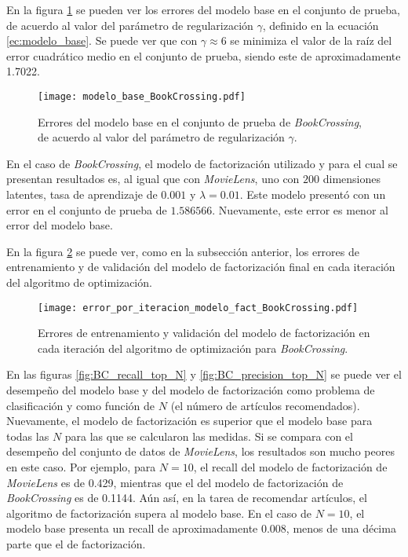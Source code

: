 En la figura \ref{fig:BC_modelo_base_errores} se pueden ver los errores del modelo base en el conjunto de prueba, de acuerdo al valor del parámetro de regularización $\gamma$, definido en la ecuación \ref{ec:modelo_base}. Se puede ver que con $\gamma \approx 6$ se minimiza el valor de la raíz del error cuadrático medio en el conjunto de prueba, siendo este de aproximadamente 1.7022.

\begin{figure}[H]
	\centering
 	\texttt{[image: modelo\_base\_BookCrossing.pdf]}
 	\caption{Errores del modelo base en el conjunto de prueba de \textit{BookCrossing}, de acuerdo al valor del parámetro de regularización $\gamma$.}
 	\label{fig:BC_modelo_base_errores}
\end{figure}

En el caso de \textit{BookCrossing}, el modelo de factorización utilizado y para el cual se presentan resultados es, al igual que con \textit{MovieLens}, uno con $200$ dimensiones latentes, tasa de aprendizaje de $0.001$ y $\lambda = 0.01$. Este modelo presentó con un error en el conjunto de prueba de $1.586566$. Nuevamente, este error es menor al error del modelo base.

En la figura \ref{fig:BC_modelo_fact_error_por_iter} se puede ver, como en la subsección anterior, los errores de entrenamiento y de validación del modelo de factorización final en cada iteración del algoritmo de optimización.

\begin{figure}[H]
	\centering
 	\texttt{[image: error\_por\_iteracion\_modelo\_fact\_BookCrossing.pdf]}
 	\caption{Errores de entrenamiento y validación del modelo de factorización en cada iteración del algoritmo de optimización para \textit{BookCrossing}.}
 	\label{fig:BC_modelo_fact_error_por_iter}
\end{figure}

En las figuras \ref{fig:BC_recall_top_N} y \ref{fig:BC_precision_top_N} se puede ver el desempeño del modelo base y del modelo de factorización como problema de clasificación y como función de $N$ (el número de artículos recomendados). Nuevamente, el modelo de factorización es superior que el modelo base para todas las $N$ para las que se calcularon las medidas. Si se compara con el desempeño del conjunto de datos de \textit{MovieLens}, los resultados son mucho peores en este caso. Por ejemplo, para $N = 10$, el recall del modelo de factorización de \textit{MovieLens} es de 0.429, mientras que el del modelo de factorización de \textit{BookCrossing} es de 0.1144. Aún así, en la tarea de recomendar artículos, el algoritmo de factorización supera al modelo base. En el caso de $N = 10$, el modelo base presenta un recall de aproximadamente 0.008, menos de una décima parte que el de factorización.

